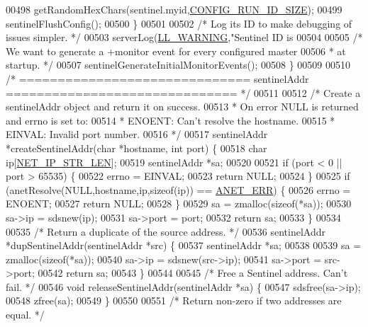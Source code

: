 \begin{DoxyCode}
{00498         getRandomHexChars(sentinel.myid,\hyperlink{server_8h_aba6794fa3ee28f85165eaed93190f1df}{CONFIG\_RUN\_ID\_SIZE});
00499         sentinelFlushConfig();
00500     \}
00501 
00502     \textcolor{comment}{/* Log its ID to make debugging of issues simpler. */}
00503     serverLog(\hyperlink{server_8h_a31229b9334bba7d6be2a72970967a14b}{LL\_WARNING},\textcolor{stringliteral}{"Sentinel ID is %
00504 
00505     \textcolor{comment}{/* We want to generate a +monitor event for every configured master}
00506 \textcolor{comment}{     * at startup. */}
00507     sentinelGenerateInitialMonitorEvents();
00508 \}
00509 
00510 \textcolor{comment}{/* ============================== sentinelAddr ============================== */}
00511 
00512 \textcolor{comment}{/* Create a sentinelAddr object and return it on success.}
00513 \textcolor{comment}{ * On error NULL is returned and errno is set to:}
00514 \textcolor{comment}{ *  ENOENT: Can't resolve the hostname.}
00515 \textcolor{comment}{ *  EINVAL: Invalid port number.}
00516 \textcolor{comment}{ */}
00517 sentinelAddr *createSentinelAddr(\textcolor{keywordtype}{char} *hostname, \textcolor{keywordtype}{int} port) \{
00518     \textcolor{keywordtype}{char} ip[\hyperlink{server_8h_ad97c5405ed22a94e9fcc10fba577d6c0}{NET\_IP\_STR\_LEN}];
00519     sentinelAddr *sa;
00520 
00521     \textcolor{keywordflow}{if} (port < 0 || port > 65535) \{
00522         errno = EINVAL;
00523         \textcolor{keywordflow}{return} NULL;
00524     \}
00525     \textcolor{keywordflow}{if} (anetResolve(NULL,hostname,ip,\textcolor{keyword}{sizeof}(ip)) == \hyperlink{anet_8h_a0697b7774a7e0f4ef141839fe93536fe}{ANET\_ERR}) \{
00526         errno = ENOENT;
00527         \textcolor{keywordflow}{return} NULL;
00528     \}
00529     sa = zmalloc(\textcolor{keyword}{sizeof}(*sa));
00530     sa->ip = sdsnew(ip);
00531     sa->port = port;
00532     \textcolor{keywordflow}{return} sa;
00533 \}
00534 
00535 \textcolor{comment}{/* Return a duplicate of the source address. */}
00536 sentinelAddr *dupSentinelAddr(sentinelAddr *src) \{
00537     sentinelAddr *sa;
00538 
00539     sa = zmalloc(\textcolor{keyword}{sizeof}(*sa));
00540     sa->ip = sdsnew(src->ip);
00541     sa->port = src->port;
00542     \textcolor{keywordflow}{return} sa;
00543 \}
00544 
00545 \textcolor{comment}{/* Free a Sentinel address. Can't fail. */}
00546 \textcolor{keywordtype}{void} releaseSentinelAddr(sentinelAddr *sa) \{
00547     sdsfree(sa->ip);
00548     zfree(sa);
00549 \}
00550 
00551 \textcolor{comment}{/* Return non-zero if two addresses are equal. */}
}}
\end{DoxyCode}
